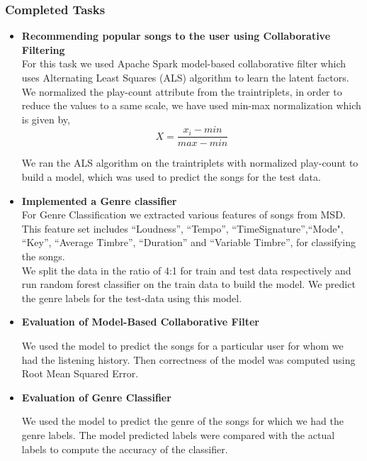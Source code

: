 \documentclass{sig-alternate-05-2015}
\begin{document}
\subsubsection{Completed Tasks}
\begin{itemize}
    \item \textbf{Recommending popular songs to the user using Collaborative Filtering}\\
    For this task we used Apache Spark model-based collaborative filter which uses Alternating Least Squares (ALS) algorithm to learn the latent factors. We normalized the play-count attribute from the traintriplets, in order to reduce the values to a same scale, we have used min-max normalization which is given by,
    \begin{equation*}
        X = \frac{x_i-min}{max-min}
    \end{equation*}
    
    We ran the ALS algorithm on the traintriplets with normalized play-count to build a model, which was used to predict the songs for the test data.
    
    \item \textbf{Implemented a Genre classifier}\\
    For Genre Classification we extracted various features of songs from MSD. This feature set includes ``Loudness'', ``Tempo'', ``TimeSignature'',``Mode", ``Key'', ``Average Timbre'', ``Duration'' and ``Variable Timbre'', for classifying the songs.\\
    
    We split the data in the ratio of 4:1 for train and test data respectively and run random forest classifier on the train data to build the model. We predict the genre labels for the test-data using this model.
    
    
    \item \textbf{Evaluation of Model-Based Collaborative Filter}
    
    We used the model to predict the songs for a particular user for whom we had the listening history. Then correctness of the model was computed using Root Mean Squared Error. 
    
    \item \textbf{Evaluation of Genre Classifier}
    
    We used the model to predict the genre of the songs for which we had the genre labels. The model predicted labels were compared with the actual labels to compute the accuracy of the classifier.
\end{itemize}
\end{document}
